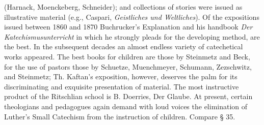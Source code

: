 (Harnack, Moenckeberg, Schneider); and collections of stories were issued as illustrative material (e.g., Caspari, \emph{Geistliches und Weltliches}). Of the expositions issued between 1860 and 1870 Buchrucker’s Explanation and his handbook \emph{Der Katechismusunterricht} in which he strongly pleads for the developing method, are the best. In the subsequent decades an almost endless variety of catechetical works appeared. The best books for children are those by Steinmetz and Beck, for the use of pastors those by Schuetze, Muenchmeyer, Schumann, Zezschwitz, and Steinmetz; Th. Kaftan’s exposition, however, deserves the palm for its discriminating and exquisite presentation of material. The most instructive product of the Ritschlian school is B. Doerries, Der Glaube. At present, certain theologians and pedagogues again demand with loud voices the elimination of Luther’s Small Catechism from the instruction of children. Compare § 35.

